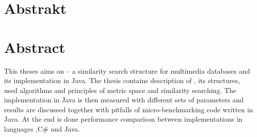 \section*{Abstrakt}
\section*{Abstract}
This theses aims on \MIndex{} -- a similarity search structure for multimedia databases and its implementation in Java.
The thesis contains description of \MIndex, its structures, used algorithms and principles of metric space and similarity searching.
The implementation in Java is then measured with different sets of parameters and results are discussed together with pitfalls of micro-benchmarking code written in Java.
At the end is done performance comparison between \MIndex{} implementations in languages \CC,C\# and Java.
\newpage